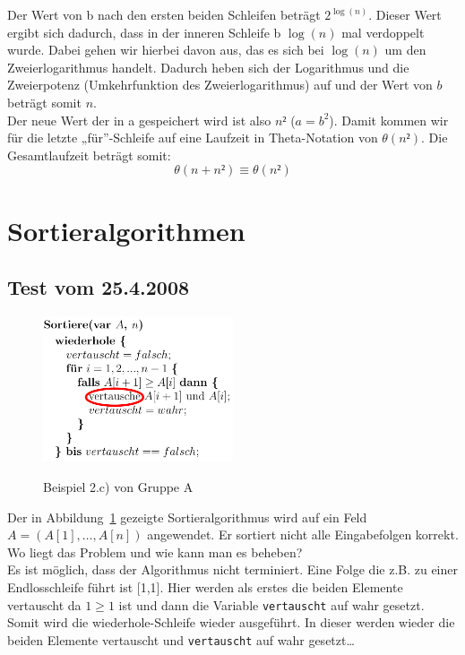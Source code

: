 \documentclass[a4paper, 12pt]{article}
\begin{document}
Der Wert von b nach den ersten beiden Schleifen beträgt $2^{\log(n)}$. Dieser Wert ergibt sich dadurch, dass in der inneren Schleife b $\log(n)$ mal verdoppelt wurde. Dabei gehen wir hierbei davon aus, das es sich bei $\log(n)$ um den Zweierlogarithmus handelt. Dadurch heben sich der Logarithmus und die Zweierpotenz (Umkehrfunktion des Zweierlogarithmus) auf und der Wert von $b$ beträgt somit $n$.\\

Der neue Wert der in a gespeichert wird ist also $n²$ ($a=b^2$). Damit kommen wir für die letzte „für”-Schleife auf eine Laufzeit in Theta-Notation von $θ(n²)$. Die Gesamtlaufzeit beträgt somit: $$θ\left(n+n²\right) \equiv θ\left(n²\right)$$

\section{Sortieralgorithmen}

\subsection{Test vom 25.4.2008}

\begin{figure}[htbp]
	\caption{Beispiel 2.c) von Gruppe A}
	\vskip 0.2cm
	\centering
	\includegraphics[width=0.5\textwidth]{Figures/Test_2008-04-25_2Ab}
	\label{figure:Test_2008-04-25_2Ab}
\end{figure}

Der in Abbildung~\ref{figure:Test_2008-04-25_2Ab} gezeigte Sortieralgorithmus wird auf ein Feld $A=\left(A[1],\dots,A[n]\right)$ angewendet. Er sortiert nicht alle Eingabefolgen korrekt. Wo liegt das Problem und wie kann man es beheben?\\

Es ist möglich, dass der Algorithmus nicht terminiert. Eine Folge die z.B. zu einer Endlosschleife führt ist [1,1]. Hier werden als erstes die beiden Elemente vertauscht da $1≥1$ ist und dann die Variable \texttt{vertauscht} auf wahr gesetzt. Somit wird die wiederhole-Schleife wieder ausgeführt. In dieser werden wieder die beiden Elemente vertauscht und \texttt{vertauscht} auf wahr gesetzt\dots\\
\end{document}
